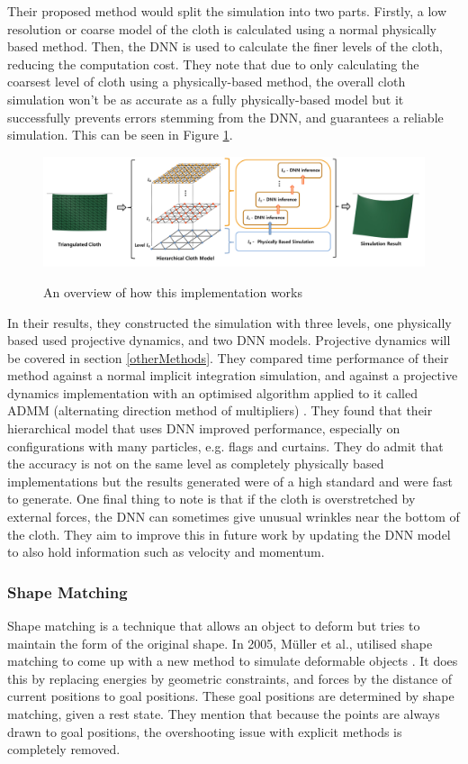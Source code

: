 \documentclass[12pt,a4paper]{article}
\begin{document}
Their proposed method would split the simulation into two parts. Firstly, a low resolution or coarse model of the cloth is calculated using a normal physically based method. Then, the DNN is used to calculate the finer levels of the cloth, reducing the computation cost. They note that due to only calculating the coarsest level of cloth using a physically-based method, the overall cloth simulation won't be as accurate as a fully physically-based model but it successfully prevents errors stemming from the DNN, and guarantees a reliable simulation. This can be seen in Figure \ref{fig:DNN}.
\begin{figure}[h]
	\caption{An overview of how this implementation works}
	\includegraphics[width=\textwidth]{DNN.png}
	\label{fig:DNN}
\end{figure}

In their results, they constructed the simulation with three levels, one physically based used projective dynamics, and two DNN models. Projective dynamics will be covered in section \ref{otherMethods}. They compared time performance of their method against a normal implicit integration simulation, and against a projective dynamics implementation with an optimised algorithm applied to it called ADMM (alternating direction method of multipliers) \cite{ADMM}. They found that their hierarchical model that uses DNN improved performance, especially on configurations with many particles, e.g. flags and curtains. They do admit that the accuracy is not on the same level as completely physically based implementations but the results generated were of a high standard and were fast to generate. One final thing to note is that if the cloth is overstretched by external forces, the DNN can sometimes give unusual wrinkles near the bottom of the cloth. They aim to improve this in future work by updating the DNN model to also hold information such as velocity and momentum.


\subsubsection{Shape Matching}
Shape matching is a technique that allows an object to deform but tries to maintain the form of the original shape. In 2005, Müller et al., utilised shape matching to come up with a new method to simulate deformable objects \cite{ogshapematching}. It does this by replacing energies by geometric constraints, and forces by the distance of current positions to goal positions. These goal positions are determined by shape matching, given a rest state. They mention that because the points are always drawn to goal positions, the overshooting issue with explicit methods is completely removed.\\
\end{document}
